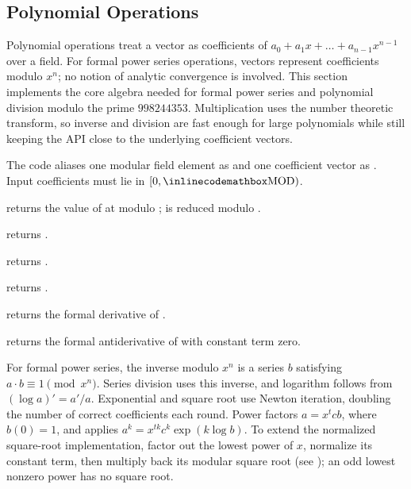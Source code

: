 \subsection{Polynomial Operations}
\label{sec:6.6.3}
Polynomial operations treat a vector  as coefficients of $a_0 + a_1 x + \dots + a_{n-1} x^{n-1}$ over a field. For formal power series operations, vectors represent coefficients modulo $x^n$; no notion of analytic convergence is involved. This section implements the core algebra needed for formal power series and polynomial division modulo the prime $998244353$. Multiplication uses the number theoretic transform, so inverse and division are fast enough for large polynomials while still keeping the API close to the underlying coefficient vectors.

The code aliases one modular field element as  and one coefficient vector as . Input coefficients must lie in $[0, {\inlinecodemath{MOD}})$.

\begin{compactitem}
  \item {} returns the value of  at  modulo ;  is reduced modulo .
  \item {} returns .
  \item {} returns .
  \item {} returns .
  \item {} returns the formal derivative of .
  \item {} returns the formal antiderivative of  with constant term zero.
\end{compactitem}

For formal power series, the inverse modulo $x^n$ is a series $b$ satisfying $a \cdot b \equiv 1 \pmod{x^n}$. Series division uses this inverse, and logarithm follows from $(\log a)' = a'/a$. Exponential and square root use Newton iteration, doubling the number of correct coefficients each round. Power factors $a = x^t c b$, where $b(0) = 1$, and applies $a^k = x^{tk} c^k \exp(k \log b)$. To extend the normalized square-root implementation, factor out the lowest power of $x$, normalize its constant term, then multiply back its modular square root (see ); an odd lowest nonzero power has no square root.

